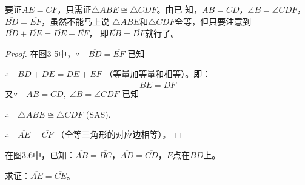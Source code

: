 \begin{analyze}
    要证$\overline{AE}=\overline{CF}$，只需证$\triangle ABE\cong \triangle CDF$。由已
知，$\overline{AB}=\overline{CD}$，$\angle B=\angle CDF$，$\overline{BD}=\overline{EF}$，虽然不能马上说
$\triangle ABE$和$\triangle CDF$全等，但只要注意到$\overline{BD}+\overline{DE}=\overline{DE}+\overline{EF}$，
即$\overline{EB}=\overline{DF}$就行了。
\end{analyze}

\begin{proof}
    在图3-5中，$\because\quad \overline{BD}=\overline{EF}$ 已知

$\therefore\quad \overline{BD}+\overline{DE}=\overline{DE}+\overline{EF}$ （等量加等量和相等）。即：
\[\overline{BE}=\overline{DF}\]
又$\because\quad \overline{AB}=\overline{CD},\; \angle B =\angle CDF$ 已知

$\therefore\quad \triangle ABE\cong \triangle CDF$ (SAS).

$\therefore\quad \overline{AE}=\overline{CF}$ （全等三角形的对应边相等）。
\end{proof}

\begin{figure}
    \begin{minipage}[t]{0.48\linewidth}
    \centering
{}
    \caption{ }
    \end{minipage}
    \begin{minipage}[t]{0.48\linewidth}
    \centering
    \caption{ }
    \end{minipage}
    \end{figure}

\begin{example}
    在图3.6中，已知：$\overline{AB}=\overline{BC}$，$\overline{AD}=\overline{CD}$，$E$点在$BD$上。

求证：$\overline{AE}=\overline{CE}$。
\end{example}

